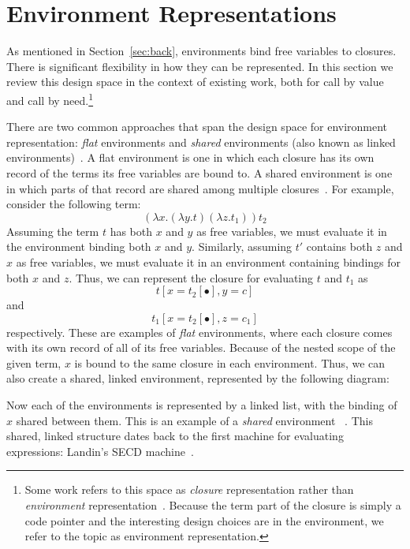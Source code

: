 \section{Environment Representations} \label{sec:env}

As mentioned in Section~\ref{sec:back}, environments bind free variables to
closures. There is significant flexibility in how they can be represented. In
this section we review this design space in the context of existing work, both
for call by value and call by need.\footnote{Some work refers to this
space as \emph{closure} representation rather than \emph{environment}
representation~\cite{shao1994space,appel1988optimizing}.  Because the term
part of the closure is simply a code pointer and the
interesting design choices are in the environment, we refer to
the topic as environment representation.}

There are two common approaches that span the design space for environment
representation: \emph{flat} environments and \emph{shared} environments (also
known as linked environments)~\cite{appel1988optimizing,shao1994space}. A flat
environment is one in which each closure has its own record of the terms 
its free variables are bound to. A shared environment is one in which parts of
that record are shared among multiple
closures~\cite{appel1988optimizing,shao1994space}. For example, consider the
following term: $$(\lambda x.(\lambda y.t) (\lambda z.t_1)) t_2$$ Assuming the
term $t$ has both $x$ and $y$ as free
variables, we must evaluate it in the environment binding both $x$ and $y$.
Similarly, assuming $t'$ contains both $z$ and $x$ as free variables, we must
evaluate it in an environment containing bindings for both $x$ and $z$. Thus, we
can represent the closure for evaluating $t$ and $t_1$  as $$t[x=t_2[\bullet],
y=c]$$ and $$t_1[x=t_2[\bullet], z=c_1]$$ respectively.  These are examples of
\emph{flat} environments, where each closure comes with its own record of all of
its free variables. Because of the nested scope of the given term, $x$ is bound
to the same closure in each environment.  Thus, we can also create a shared,
linked environment, represented by the following diagram:

\begin{center}
\end{center}
Now each of the environments is represented by a linked list, with the binding
of $x$ shared between them. This is an example of a \emph{shared} environment
~\cite{appel1988optimizing}. This shared, linked structure dates back to the 
first machine for evaluating expressions: Landin's SECD
machine~\cite{landin1964mechanical}.

